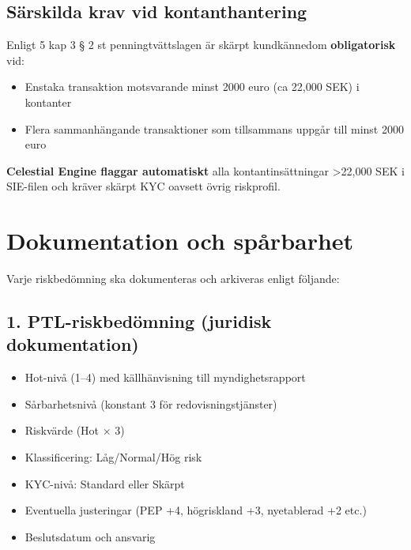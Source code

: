 \documentclass{article}
\begin{document}
\subsection*{Särskilda krav vid kontanthantering}

Enligt 5 kap 3 § 2 st penningtvättslagen är skärpt kundkännedom \textbf{obligatorisk} vid:

\begin{itemize}
\item Enstaka transaktion motsvarande minst 2000 euro (ca 22,000 SEK) i kontanter
\item Flera sammanhängande transaktioner som tillsammans uppgår till minst 2000 euro
\end{itemize}

\textbf{Celestial Engine flaggar automatiskt} alla kontantinsättningar >22,000 SEK i SIE-filen och kräver skärpt KYC oavsett övrig riskprofil.

\newpage
\section*{Dokumentation och spårbarhet}

Varje riskbedömning ska dokumenteras och arkiveras enligt följande:

\subsection*{1. PTL-riskbedömning (juridisk dokumentation)}
\begin{itemize}
\item Hot-nivå (1--4) med källhänvisning till myndighetsrapport
\item Sårbarhetsnivå (konstant 3 för redovisningstjänster)
\item Riskvärde (Hot × 3)
\item Klassificering: Låg/Normal/Hög risk
\item KYC-nivå: Standard eller Skärpt
\item Eventuella justeringar (PEP +4, högriskland +3, nyetablerad +2 etc.)
\item Beslutsdatum och ansvarig
\end{itemize}
\end{document}
